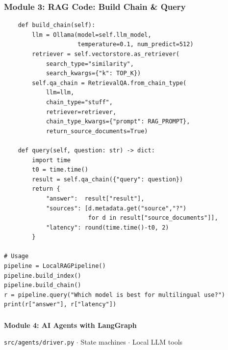 \begin{frame}[fragile]\frametitle{Module 3: RAG Code: Build Chain \& Query}
\begin{lstlisting}
    def build_chain(self):
        llm = Ollama(model=self.llm_model,
                     temperature=0.1, num_predict=512)
        retriever = self.vectorstore.as_retriever(
            search_type="similarity",
            search_kwargs={"k": TOP_K})
        self.qa_chain = RetrievalQA.from_chain_type(
            llm=llm,
            chain_type="stuff",
            retriever=retriever,
            chain_type_kwargs={"prompt": RAG_PROMPT},
            return_source_documents=True)

    def query(self, question: str) -> dict:
        import time
        t0 = time.time()
        result = self.qa_chain({"query": question})
        return {
            "answer":  result["result"],
            "sources": [d.metadata.get("source","?")
                        for d in result["source_documents"]],
            "latency": round(time.time()-t0, 2)
        }

# Usage
pipeline = LocalRAGPipeline()
pipeline.build_index()
pipeline.build_chain()
r = pipeline.query("Which model is best for multilingual use?")
print(r["answer"], r["latency"])
\end{lstlisting}
\end{frame}

\begin{frame}[fragile]\frametitle{}
\begin{center}
{\Large \textbf{Module 4: AI Agents with LangGraph}}\

\texttt{src/agents/driver.py} $\cdot$ State machines $\cdot$ Local LLM tools
\end{center}
\end{frame}

